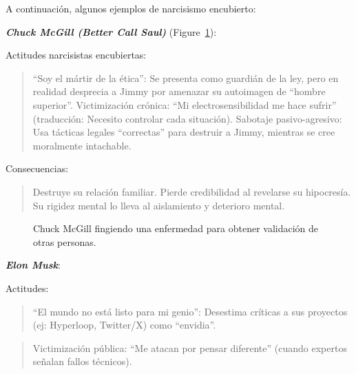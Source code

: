 \documentclass[
]{article}
\begin{document}
A continuación, algunos ejemplos de narcisismo encubierto:

\textbf{\emph{Chuck McGill (Better Call Saul)}}
(Figure~\ref{fig-chuck}):

Actitudes narcisistas encubiertas:

\begin{quote}
``Soy el mártir de la ética'': Se presenta como guardián de la ley, pero
en realidad desprecia a Jimmy por amenazar su autoimagen de ``hombre
superior''. Victimización crónica: ``Mi electrosensibilidad me hace
sufrir'' (traducción: Necesito controlar cada situación). Sabotaje
pasivo-agresivo: Usa tácticas legales ``correctas'' para destruir a
Jimmy, mientras se cree moralmente intachable.
\end{quote}

Consecuencias:

\begin{quote}
Destruye su relación familiar. Pierde credibilidad al revelarse su
hipocresía. Su rigidez mental lo lleva al aislamiento y deterioro
mental.
\end{quote}

\begin{figure}


\caption{\label{fig-chuck}Chuck McGill fingiendo una enfermedad para
obtener validación de otras personas.}

\end{figure}%

\textbf{\emph{Elon Musk}}:

Actitudes:

\begin{quote}
``El mundo no está listo para mi genio'': Desestima críticas a sus
proyectos (ej: Hyperloop, Twitter/X) como ``envidia''.
\end{quote}

\begin{quote}
Victimización pública: ``Me atacan por pensar diferente'' (cuando
expertos señalan fallos técnicos).
\end{quote}
\end{document}

